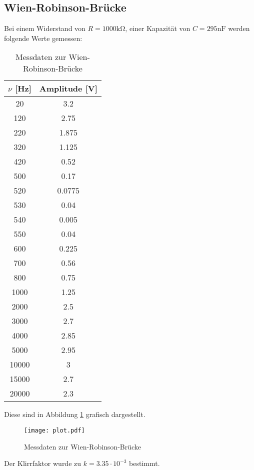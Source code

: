 \subsection{Wien-Robinson-Brücke}
  Bei einem Widerstand von $R=1000 \si{\kilo\ohm}$, einer Kapazität von $C = 295 \si{\nano\farad}$
  werden folgende Werte gemessen:
  \begin{table}[H]
    \centering
    \caption{Messdaten zur Wien-Robinson-Brücke}
    \label{tab:some}
    \begin{tabular}{c c}
     \toprule
      $\nu$ [Hz] & Amplitude [V]\\
     \midrule
     20 & 3.2    \\
     120 & 2.75   \\
     220 & 1.875  \\
     320 & 1.125  \\
     420 & 0.52   \\
     500 & 0.17   \\
     520 & 0.0775 \\
     530 & 0.04   \\
     540 & 0.005  \\
     550 & 0.04   \\
     600 & 0.225  \\
     700 & 0.56   \\
     800 & 0.75   \\
    1000 & 1.25   \\
    2000 & 2.5    \\
    3000 & 2.7    \\
    4000 & 2.85   \\
    5000 & 2.95   \\
    10000 & 3      \\
    15000 & 2.7    \\
    20000 & 2.3    \\
    \bottomrule
    \end{tabular}
  \end{table} 
  Diese sind in Abbildung \ref{fig:plot} grafisch dargestellt.
  \begin{figure}
      \centering
      \texttt{[image: plot.pdf]}
      \caption{Messdaten zur Wien-Robinson-Brücke}
    \label{fig:plot}
  \end{figure}
  Der Klirrfaktor wurde zu $k=3.35 \cdot 10^{-3}$ bestimmt.

